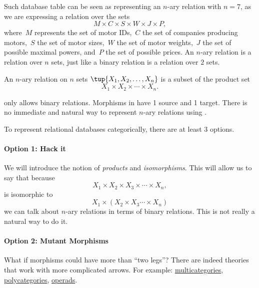 
Such database table can be seen as representing an $n$-ary relation with $n = 7$, as we are expressing a relation
over the sets
\begin{equation*}
    M\times C\times S\times W\times J\times P,
\end{equation*}
where~$M$ represents the set of motor IDs,~$C$ the set of companies producing motors,~$S$ the set of motor sizes,~$W$ the set of motor weights,~$J$ the set of possible maximal powers, and~$P$ the set of possible prices.
An $n$-ary relation is a relation over $n$ sets, just like a binary relation is a relation over $2$ sets.

\begin{definition}
    \label{def:n-ary-relation}
    An $n$-ary relation on $n$ sets $\tup{X_1, X_2, \dots, X_n}$ is a
    subset of the product set
    \begin{equation*}
        X_1 \times X_2 \times \cdots \times X_n.
    \end{equation*}
\end{definition}

\Rel only allows binary relations. Morphisms in \Rel have 1 source and 1 target. There is no immediate and natural way to represent $n$-ary relations using \Rel.

To represent relational databases categorically, there are at least 3 options.

\paragraph{Option 1: Hack it}
We will introduce the notion of \emph{products} and \emph{isomorphisms}.
This will allow us to say that because
\begin{equation*}
    X_1 \times X_2 \times X_3 \times \cdots \times X_n,
\end{equation*}
is isomorphic to
\begin{equation*}
    X_1 \times ( X_2 \times X_3 \cdots \times X_n)
\end{equation*}
we can talk about $n$-ary relations in terms of binary relations.
This is not really a natural way to do it.

\paragraph{Option 2: Mutant Morphisms}
What if morphisms could have more than ``two legs''? There are indeed theories that work with more complicated arrows.
For example: \href{https://ncatlab.org/nlab/show/multicategory}{multicategories}, \href{https://ncatlab.org/nlab/show/polycategory}{polycategories}, \href{https://ncatlab.org/nlab/show/operad}{operads}.

